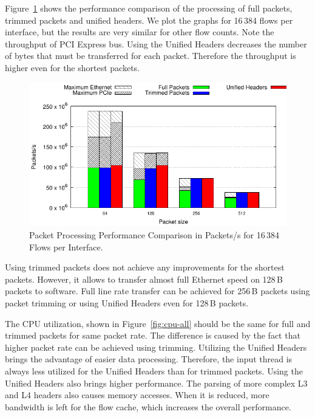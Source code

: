 Figure~\ref{fig:pkt-all} shows the performance comparison of the processing of full packets, trimmed packets and unified headers. We plot the graphs for 16\,384 flows per interface, but the results are very similar for other flow counts. Note the throughput of PCI Express bus. Using the Unified Headers decreases the number of bytes that must be transferred for each packet. Therefore the throughput is higher even for the shortest packets.

\begin{figure}[!htb]
    \centering 
    \includegraphics{figures/paper-highdensity/graphs/packets-all.pdf}
    \caption{Packet Processing Performance Comparison in Packets/s for 16\,384 Flows per Interface.}
    \label{fig:pkt-all}
\end{figure}

Using trimmed packets does not achieve any improvements for the shortest packets. However, it allows to transfer almost full Ethernet speed on 128\,B packets to software. Full line rate transfer can be achieved for 256\,B packets using packet trimming or using Unified Headers even for 128\,B packets.

The CPU utilization, shown in Figure~\ref{fig:cpu-all} should be the same for full and trimmed packets for same packet rate. The difference is caused by the fact that higher packet rate can be achieved using trimming. Utilizing the Unified Headers brings the advantage of easier data processing. Therefore, the input thread is always less utilized for the Unified Headers than for trimmed packets. Using the Unified Headers also brings higher performance. The parsing of more complex L3 and L4 headers also causes memory accesses. When it is reduced, more bandwidth is left for the flow cache, which increases the overall performance.

